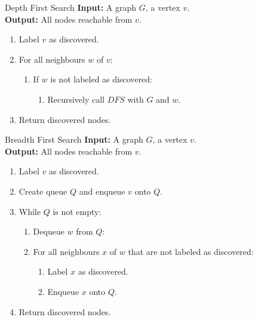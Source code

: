 \documentclass[english]{panikzettel}
\begin{document}
\begin{halfboxl}
    \vspace{-\baselineskip}
    \begin{algo}{Depth First Search}
        \textbf{Input:} A graph $G$, a vertex $v$.\\
        \textbf{Output:} All nodes reachable from $v$.
        \tcblower
        \begin{enumerate}
            \item Label $v$ as discovered.
            \item For all neighbours $w$ of $v$:
            \begin{enumerate}
                \item If $w$ is not labeled as discovered:
                \begin{enumerate}
                    \item Recursively call $DFS$ with $G$ and $w$.
                \end{enumerate}
            \end{enumerate}
            \item Return discovered nodes.
        \end{enumerate}
    \end{algo}
\end{halfboxl}%
\begin{halfboxr}
    \vspace{-\baselineskip}
    \begin{algo}{Breadth First Search}
        \textbf{Input:} A graph $G$, a vertex $v$.\\
        \textbf{Output:} All nodes reachable from $v$.
        \tcblower
        \begin{enumerate}
            \item Label $v$ as discovered.
            \item Create queue $Q$ and enqueue $v$ onto $Q$.
            \item While $Q$ is not empty:
                \begin{enumerate}
                    \item Dequeue $w$ from $Q$:
                    \item For all neighbours $x$ of $w$ that are not labeled as discovered:
                        \begin{enumerate}
                            \item Label $x$ as discovered.
                            \item Enqueue $x$ onto $Q$.
                        \end{enumerate}
                \end{enumerate}
            \item Return discovered nodes.
        \end{enumerate}
    \end{algo}
\end{halfboxr}
\end{document}
